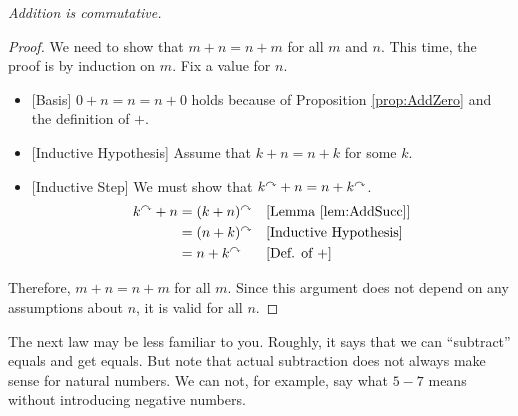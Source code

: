 \begin{prop}

  \emph{Addition is commutative.}

\begin{proof}
  We need to show that $m+n = n + m$ for all $m$ and $n$.  This time,
  the proof is by induction on $m$. Fix a value for $n$.
  \begin{itemize}
  \item{}[Basis] $0 + n = n = n + 0$ holds because of Proposition
    \ref{prop:AddZero} and the definition of $+$.
  \item{}[Inductive Hypothesis] Assume that $k + n = n + k$ for some
    $k$.
  \item{}[Inductive Step] We must show that $k^\curvearrowright + n = n + k^\curvearrowright$.
    \begin{align*}
      k^\curvearrowright + n &= (k + n)^\curvearrowright&&\text{[Lemma \ref{lem:AddSucc}]}\\
      &=  (n+k)^\curvearrowright&&\text{[Inductive Hypothesis]}\\
      &= n + k^\curvearrowright&&\text{[Def. of $+$]}
    \end{align*}
  \end{itemize}
  Therefore, $m + n = n + m$ for all $m$. Since this argument does not
  depend on any assumptions about $n$, it is valid for all $n$.
\end{proof}
\end{prop}

The next law may be less familiar to you. Roughly, it says that we can ``subtract'' equals and get equals. But note that actual subtraction does not always make sense for natural numbers. We can not, for example, say what $5-7$ means without introducing negative numbers.

\printbreak

